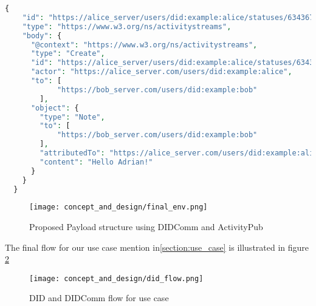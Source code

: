 \lstset{style=JSONStyle}
\begin{lstlisting}[language=PHP, caption=JWM example, label=fig:jwm_example, float=h]
  {
    "id": "https://alice_server/users/did:example:alice/statuses/634367/activity",
    "type": "https://www.w3.org/ns/activitystreams",
    "body": {
      "@context": "https://www.w3.org/ns/activitystreams",
      "type": "Create",
      "id": "https://alice_server/users/did:example:alice/statuses/634367/activity",
      "actor": "https://alice_server.com/users/did:example:alice",
      "to": [ 
            "https://bob_server.com/users/did:example:bob"
        ],
      "object": {
        "type": "Note",
        "to": [ 
            "https://bob_server.com/users/did:example:bob"
        ],
        "attributedTo": "https://alice_server.com/users/did:example:alice",
        "content": "Hello Adrian!"
      }
    }
  }
\end{lstlisting}

\begin{figure}[h]
  \centering
  \texttt{[image: concept\_and\_design/final\_env.png]}
  \caption{Proposed Payload structure using DIDComm and ActivityPub}
  \label{fig:final_env}
\end{figure}

The final flow for our use case mention in\ref{section:use_case} is illustrated in figure \ref{fig:did_flow}

\begin{figure}[h]
  \centering
  \texttt{[image: concept\_and\_design/did\_flow.png]}
  \caption{DID and DIDComm flow for use case}
  \label{fig:did_flow}
\end{figure}



%







